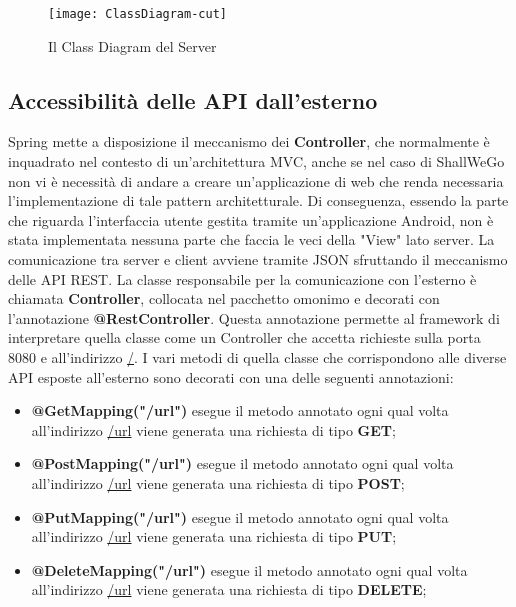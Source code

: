        \begin{figure}[H]
            \texttt{[image: ClassDiagram-cut]}
            \caption{Il Class Diagram del Server}
            \label{fig: Il Class Diagram del Server}
        \end{figure}

    \subsection{Accessibilità delle API dall'esterno}
        Spring mette a disposizione il meccanismo dei \textbf{Controller}, che normalmente è inquadrato nel contesto di un'architettura MVC, anche se nel caso di ShallWeGo non vi è necessità di andare a creare un'applicazione di web che renda necessaria l'implementazione di tale pattern architetturale. Di conseguenza, essendo la parte che riguarda l'interfaccia utente gestita tramite un'applicazione Android, non è stata implementata nessuna parte che faccia le veci della "View" lato server. La comunicazione tra server e client avviene tramite JSON sfruttando il meccanismo delle API REST. La classe responsabile per la comunicazione con l'esterno è chiamata \textbf{Controller}, collocata nel pacchetto omonimo e decorati con l'annotazione \textbf{@RestController}. Questa annotazione permette al framework di interpretare quella classe come un Controller che accetta richieste sulla porta 8080 e all'indirizzo \url{/}. I vari metodi di quella classe che corrispondono alle diverse API esposte all'esterno sono decorati con una delle seguenti annotazioni:

        \begin{itemize}
            \item \textbf{@GetMapping("/url")} esegue il metodo annotato ogni qual volta all'indirizzo \url{/url} viene generata una richiesta di tipo \textbf{GET};
            \item \textbf{@PostMapping("/url")} esegue il metodo annotato ogni qual volta all'indirizzo \url{/url} viene generata una richiesta di tipo \textbf{POST};
            \item \textbf{@PutMapping("/url")} esegue il metodo annotato ogni qual volta all'indirizzo \url{/url} viene generata una richiesta di tipo \textbf{PUT};
            \item \textbf{@DeleteMapping("/url")} esegue il metodo annotato ogni qual volta all'indirizzo \url{/url} viene generata una richiesta di tipo \textbf{DELETE};
        \end{itemize}

